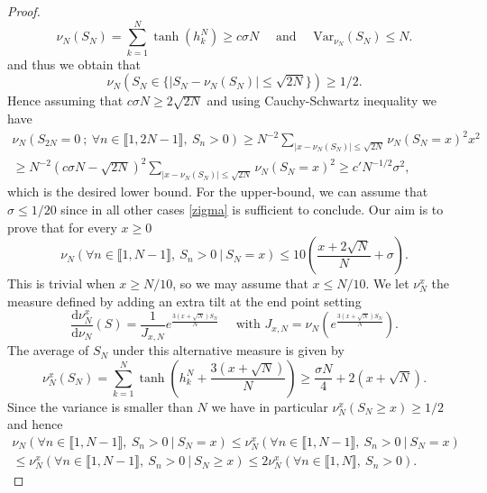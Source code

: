 \documentclass[reqno,11pt]{amsart}
\numberwithin{equation}{section}
\newcommand{\lint}{\llbracket}
\newcommand{\rint}{\rrbracket}
\newcommand{\Var}{\mathrm{Var}}
\newcommand{\dd}{\mathrm{d}}
\begin{document}
\begin{proof}
\begin{equation}
 \nu_N(S_N)=\sum^N_{k=1}\tanh(h^N_k)\ge c\sigma N \quad   \text{ and } \quad  \Var_{\nu_N}(S_N)\le N.
\end{equation}
and thus we  obtain that 
\begin{equation}
 \nu_N( S_N \in \{ |S_N-\nu_N(S_N)| \le  \sqrt{2N}\} )\ge 1/2.
\end{equation}
Hence assuming that $c\sigma N\ge  2\sqrt{2N}$ and using Cauchy-Schwartz inequality we have 
\begin{multline}
   \nu_{N}\left( S_{2N}=0 \ ; \ \forall n\in \lint 1,2N-1\rint, \ S_{n}>0  \right)
   \ge N^{-2}\sum_{ |x-\nu_N(S_N)| \le  \sqrt{2N}}    \nu_{N}( S_N=x)^2 x^2 \\
   \ge N^{-2} (c\sigma N- \sqrt{2N})^2 \sum_{ |x-\nu_N(S_N)| \le  \sqrt{2N}}    \nu_{N}( S_N=x)^2
   \ge c'N^{-1/2} \sigma^2,
\end{multline}
which is the desired lower bound. 
For the upper-bound, we can assume that $\sigma\le 1/20$ since in all other cases 
\eqref{zigma} is sufficient to conclude.
  Our aim is to prove that for every $x\ge 0$
   \begin{equation}\label{ouraim}
    \nu_{N}\left(   \forall n\in \lint 1,N-1\rint, \ S_{n} >0 \ | \  S_N = x  \right)  \le 10\left(\frac{x+2\sqrt{N}}{N}+\sigma\right).
 \end{equation}
 This is trivial when $x\ge N/10$, so we may assume that $x\le N/10$.
We let $\nu^x_N$ the measure defined by adding an extra tilt at the end point setting 
\begin{equation}
\frac{ \dd \nu^{x}_N}{\dd \nu_N}(S)= \frac{1}{J_{x,N}}e^{\frac{3 (x+\sqrt{N}) S_N}{N}} \quad \text{ with }  J_{x,N}= \nu_N\left(e^{\frac{3 (x+\sqrt{N}) S_N}{N}} \right).
\end{equation}
The average of $S_N$ under this alternative measure is given by
\begin{equation}
 \nu^x_N(S_N)= \sum_{k=1}^N \tanh\left( h^N_k+ \frac{3(x+\sqrt{N})}{N}\right)\ge \frac{\sigma N}{4}+ 2(x+\sqrt{N}).
\end{equation}
Since the variance is smaller than $N$ we have in particular   $\nu^x_N(S_N\ge x)\ge 1/2$ and hence
\begin{multline}\label{combi1}
 \nu_{N}\left(   \forall n\in \lint 1,N-1\rint, \ S_{n} >0 \ | \  S_N = x  \right)
  \le  \nu^x_{N}\left(   \forall n\in \lint 1,N-1\rint, \ S_{n} >0 \ | \  S_N = x  \right)\\
 \le  \nu^x_{N}\left(   \forall n\in \lint 1,N-1\rint, \ S_{n} >0 \ | \  S_N \ge x  \right)
 \le 2 \nu^x_{N}\left(   \forall n\in \lint 1,N\rint, \ S_{n} >0 \right).

\end{multline}
\end{proof}
\end{document}
